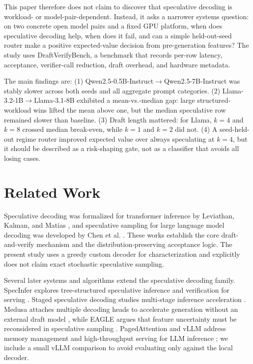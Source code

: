 \documentclass{article}
\begin{document}
This paper therefore does not claim to discover that speculative decoding is workload- or model-pair-dependent.
Instead, it asks a narrower systems question: on two concrete open model pairs and a fixed GPU platform, when does speculative decoding help, when does it fail, and can a simple held-out-seed router make a positive expected-value decision from pre-generation features?
The study uses DraftVerifyBench, a benchmark that records per-row latency, acceptance, verifier-call reduction, draft overhead, and hardware metadata.

The main findings are:
(1) Qwen2.5-0.5B-Instruct$\rightarrow$Qwen2.5-7B-Instruct was stably slower across both seeds and all aggregate prompt categories.
(2) Llama-3.2-1B$\rightarrow$Llama-3.1-8B exhibited a mean-vs.-median gap: large structured-workload wins lifted the mean above one, but the median speculative row remained slower than baseline.
(3) Draft length mattered: for Llama, $k=4$ and $k=8$ crossed median break-even, while $k=1$ and $k=2$ did not.
(4) A seed-held-out regime router improved expected value over always speculating at $k=4$, but it should be described as a risk-shaping gate, not as a classifier that avoids all losing cases.

\section{Related Work}

Speculative decoding was formalized for transformer inference by Leviathan, Kalman, and Matias \cite{leviathan2022speculative}, and speculative sampling for large language model decoding was developed by Chen et al. \cite{chen2023speculative}.
These works establish the core draft-and-verify mechanism and the distribution-preserving acceptance logic.
The present study uses a greedy custom decoder for characterization and explicitly does not claim exact stochastic speculative sampling.

Several later systems and algorithms extend the speculative decoding family.
SpecInfer explores tree-structured speculative inference and verification for serving \cite{miao2023specinfer}.
Staged speculative decoding studies multi-stage inference acceleration \cite{spector2023staged}.
Medusa attaches multiple decoding heads to accelerate generation without an external draft model \cite{cai2024medusa}, while EAGLE argues that feature uncertainty must be reconsidered in speculative sampling \cite{li2024eagle}.
PagedAttention and vLLM address memory management and high-throughput serving for LLM inference \cite{kwon2023pagedattention}; we include a small vLLM comparison to avoid evaluating only against the local decoder.
\end{document}
